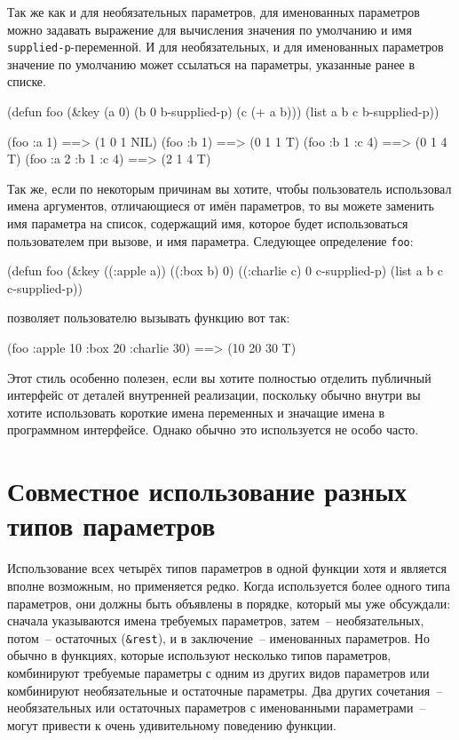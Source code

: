 Так же как и для необязательных параметров, для именованных параметров можно задавать
выражение для вычисления значения по умолчанию и имя \lstinline{supplied-p}-переменной.  И для
необязательных, и для именованных параметров значение по умолчанию может ссылаться на
параметры, указанные ранее в списке.

\begin{myverb}
(defun foo (&key (a 0) (b 0 b-supplied-p) (c (+ a b)))
  (list a b c b-supplied-p))
\end{myverb}
  
\begin{myverb}
(foo :a 1)           ==> (1 0 1 NIL)
(foo :b 1)           ==> (0 1 1 T)
(foo :b 1 :c 4)      ==> (0 1 4 T)
(foo :a 2 :b 1 :c 4) ==> (2 1 4 T)
\end{myverb}

Так же, если по некоторым причинам вы хотите, чтобы пользователь использовал имена
аргументов, отличающиеся от имён параметров, то вы можете заменить имя параметра на
список, содержащий имя, которое будет использоваться пользователем при вызове, и имя
параметра.  Следующее определение \lstinline{foo}:

\begin{myverb}
(defun foo (&key ((:apple a)) ((:box b) 0) ((:charlie c) 0 c-supplied-p)
  (list a b c c-supplied-p))
\end{myverb}

\noindent{}позволяет пользователю вызывать функцию вот так:

\begin{myverb}
(foo :apple 10 :box 20 :charlie 30) ==> (10 20 30 T)
\end{myverb}

Этот стиль особенно полезен, если вы хотите полностью отделить публичный интерфейс от
деталей внутренней реализации, поскольку обычно внутри вы хотите использовать короткие
имена переменных и значащие имена в программном интерфейсе.  Однако обычно это
используется не особо часто.

\section{Совместное использование разных типов параметров}

Использование всех четырёх типов параметров в одной функции хотя и является вполне
возможным, но применяется редко.  Когда используется более одного типа параметров, они
должны быть объявлены в порядке, который мы уже обсуждали: сначала указываются имена
требуемых параметров, затем~-- необязательных, потом~-- остаточных (\lstinline!&rest!), и в
заключение~-- именованных параметров.  Но обычно в функциях, которые используют несколько
типов параметров, комбинируют требуемые параметры с одним из других видов параметров или
комбинируют необязательные и остаточные параметры.  Два других сочетания~--
необязательных или остаточных параметров с именованными параметрами~-- могут привести к
очень удивительному поведению функции.

